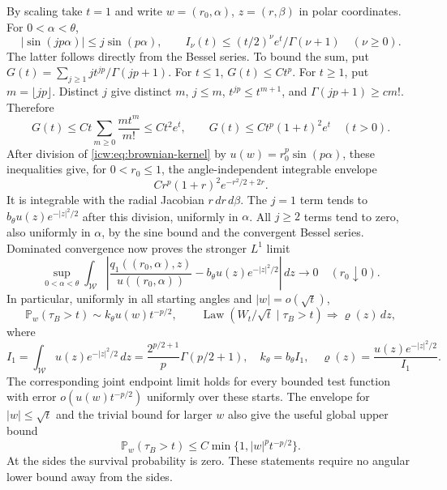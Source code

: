 \documentclass[11pt,letterpaper]{article}
\theoremstyle{remark}\newtheorem{remark}[theorem]{Remark}
\newcommand{\Prob}{\mathbb P}
\newcommand{\1}{\mathbf1}
\newcommand{\Wedge}{\mathcal W}
\begin{document}
By scaling take $t=1$ and write $w=(r_0,\alpha)$, $z=(r,\beta)$ in
polar coordinates. For $0<\alpha<\theta$,
\[
 |\sin(jp\alpha)|\le j\sin(p\alpha),\qquad
 I_\nu(t)\le (t/2)^\nu e^t/\Gamma(\nu+1)\quad(\nu\ge0).
\]
The latter follows directly from the Bessel series. To bound the sum,
put $G(t)=\sum_{j\ge1}jt^{jp}/\Gamma(jp+1)$. For $t\le1$,
$G(t)\le Ct^p$. For $t\ge1$, put $m=\lfloor jp\rfloor$. Distinct
$j$ give distinct $m$, $j\le m$, $t^{jp}\le t^{m+1}$, and
$\Gamma(jp+1)\ge c m!$. Therefore
\[
 G(t)\le Ct\sum_{m\ge0}\frac{mt^m}{m!}\le Ct^2e^t,
 \qquad G(t)\le Ct^p(1+t)^2e^t\quad(t>0).
\]
After division of \eqref{icw:eq:brownian-kernel} by
$u(w)=r_0^p\sin(p\alpha)$, these inequalities give, for $0<r_0\le1$,
the angle-independent integrable envelope
\begin{equation}\label{icw:eq:envelope}
 C r^p(1+r)^2 e^{-r^2/2+2r}.
\end{equation}
It is integrable with the radial Jacobian $r\,dr\,d\beta$.
The $j=1$ term tends to $b_\theta u(z)e^{-|z|^2/2}$ after this
division, uniformly in $\alpha$. All $j\ge2$ terms tend to zero,
also uniformly in $\alpha$, by the sine bound and the convergent
Bessel series. Dominated convergence now proves the stronger $L^1$ limit
\begin{equation}\label{icw:eq:angle-uniform}
 \sup_{0<\alpha<\theta}\int_{\Wedge}
 \left|\frac{q_1((r_0,\alpha),z)}{u((r_0,\alpha))}
             -b_\theta u(z)e^{-|z|^2/2}\right|\,dz\longrightarrow0
 \quad(r_0\downarrow0).
\end{equation}
In particular, uniformly in all starting angles and $|w|=o(\sqrt t)$,
\begin{equation}\label{icw:eq:brownian-survival}
 \Prob_w(\tau_B>t)\sim k_\theta u(w)t^{-p/2},\qquad
 \operatorname{Law}(W_t/\sqrt t\mid\tau_B>t)\Longrightarrow\varrho(z)\,dz,
\end{equation}
where
\begin{equation}\label{icw:eq:I1}
 I_1=\int_{\Wedge}u(z)e^{-|z|^2/2}\,dz
 =\frac{2^{p/2+1}}p\Gamma(p/2+1),\quad
 k_\theta=b_\theta I_1,\quad
 \varrho(z)=\frac{u(z)e^{-|z|^2/2}}{I_1}.
\end{equation}
The corresponding joint endpoint limit holds for every bounded test
function with error $o(u(w)t^{-p/2})$ uniformly over these starts.
The envelope for $|w|\le\sqrt t$ and the trivial bound for larger $w$
also give the useful global upper bound
\begin{equation}\label{icw:eq:brownian-upper}
 \Prob_w(\tau_B>t)\le C\min\{1,|w|^pt^{-p/2}\}.
\end{equation}
At the sides the survival probability is zero. These statements require
no angular lower bound away from the sides.
\end{document}
